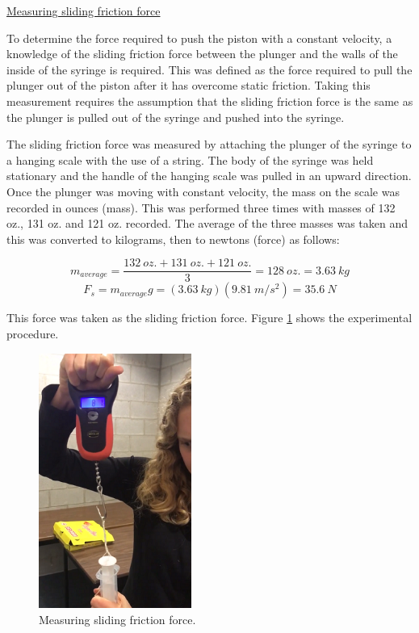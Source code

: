 \documentclass{article}
\begin{document}
\noindent\underline{Measuring sliding friction force}

To determine the force required to push the piston with a constant velocity, a knowledge of the sliding friction force between the plunger and the walls of the inside of the syringe is required. 
This was defined as the force required to pull the plunger out of the piston after it has overcome static friction.
Taking this measurement requires the assumption that the sliding friction force is the same as the plunger is pulled out of the syringe and pushed into the syringe.

The sliding friction force was measured by attaching the plunger of the syringe to a hanging scale with the use of a string. 
The body of the syringe was held stationary and the handle of the hanging scale was pulled in an upward direction.
Once the plunger was moving with constant velocity, the mass on the scale was recorded in ounces (mass).
This was performed three times with masses of 132 oz., 131 oz. and 121 oz. recorded.
The average of the three masses was taken and this was converted to kilograms, then to newtons (force) as follows:

\[ m_{average} = \frac{132 \ oz. + 131 \ oz. + 121 \ oz.}{3} = 128 \ oz. = 3.63 \ kg \]
\[ F_{s} = m_{average}g = (3.63 \ kg)(9.81 \ m/s^2) = 35.6 \ N \] 

This force was taken as the sliding friction force. Figure \ref{fig:2} shows the experimental procedure.

\begin{figure}[h!]
\centering
  \includegraphics[width=50mm]{MeasuringSlidingFriction.png}
  \captionsetup{justification=centering}
  \caption{Measuring sliding friction force.}
  \label{fig:2}
\end{figure}
\end{document}

